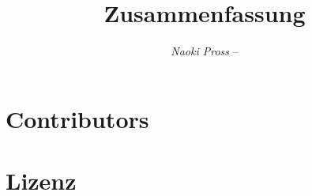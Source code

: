 \documentclass[header, margin=normal]{tex/hsrzf}
\author{\textsl{Naoki Pross} -- \texttt{\theauthoremail}}
\title{\texttt{\themodule} Zusammenfassung}
\date{\thesemester}
\begin{document}
\maketitle
\tableofcontents




% 

\section{Contributors}
\thecontributors

\section{Lizenz}
\doclicenseThis
\end{document}
